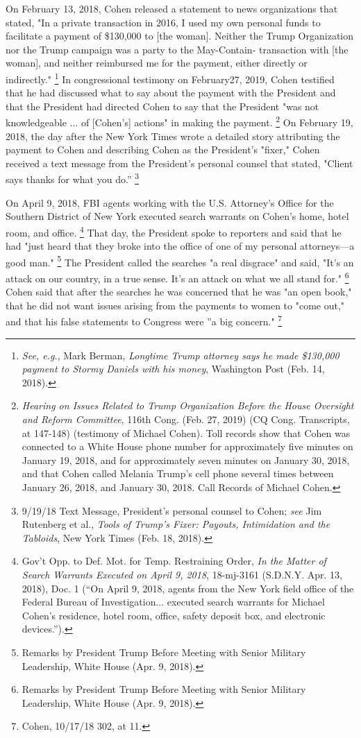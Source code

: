 {On February 13, 2018, Cohen released a statement to news organizations that stated, "In a private transaction in 2016, I used my own personal funds to facilitate a payment of \$130,000 to [the woman].
Neither the Trump Organization nor the Trump campaign was a party to the May-Contain- transaction with [the woman], and neither reimbursed me for the payment, either directly or indirectly."%
\footnote{\textit{See, e.g.}, Mark Berman, \textit{Longtime Trump attorney says he made \$130,000 payment to Stormy Daniels with his money}, Washington Post (Feb. 14, 2018).}
In congressional testimony on February27, 2019, Cohen testified that he had discussed what to say about the payment with the President and that the President had directed Cohen to say that the President "was not knowledgeable ... of [Cohen's] actions" in making the payment.%
\footnote{\textit{Hearing on Issues Related to Trump Organization Before the House Oversight and Reform Committee}, 116th Cong.
(Feb. 27, 2019) (CQ Cong. Transcripts, at 147-148) (testimony of Michael Cohen).
Toll records show that Cohen was connected to a White House phone number for approximately five minutes on January 19, 2018, and for approximately seven minutes on January 30, 2018, and that Cohen called Melania Trump’s cell phone several times between January 26, 2018, and January 30, 2018.
Call Records of Michael Cohen.}
On February 19, 2018, the day after the New York Times wrote a detailed story attributing the payment to Cohen and describing Cohen as the President's "fixer," Cohen received a text message from the President's personal counsel that stated, "Client says thanks for what you do.''%
\footnote{9/19/18 Text Message, President’s personal counsel to Cohen;
\textit{see} Jim Rutenberg et al., \textit{Tools of Trump's Fixer: Payouts, Intimidation and the Tabloids}, New York Times (Feb. 18, 2018).}

On April 9, 2018, FBI agents working with the U.S. Attorney's Office for the Southern District of New York executed search warrants on Cohen's home, hotel room, and office.%
\footnote{Gov’t Opp. to Def. Mot. for Temp. Restraining Order, \textit{In the Matter of Search Warrants Executed on April 9, 2018}, 18-mj-3161 (S.D.N.Y. Apr. 13, 2018), Doc. 1
(“On April 9, 2018, agents from the New York field office of the Federal Bureau of Investigation... executed search warrants for Michael Cohen’s residence, hotel room, office, safety deposit box, and electronic devices.”).}
That day, the President spoke to reporters and said that he had "just heard that they broke into the office of one of my personal attorneys—a good man."%
\footnote{Remarks by President Trump Before Meeting with Senior Military Leadership, White House (Apr. 9, 2018).}
The President called the searches "a real disgrace" and said, "It's an attack on our country, in a true sense.
It's an attack on what we all stand for."%
\footnote{Remarks by President Trump Before Meeting with Senior Military Leadership, White House (Apr. 9, 2018).}
Cohen said that after the searches he was concerned that he was "an open book," that he did not want issues arising from the payments to women to "come out," and that his false statements to Congress were ''a big concern."%
\footnote{Cohen, 10/17/18 302, at 11.}

}
